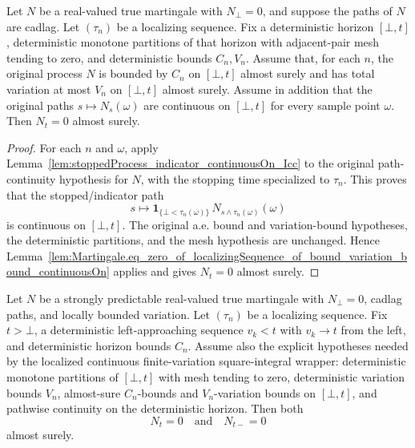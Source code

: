 \begin{lemma}\label{lem:Martingale.eq_zero_of_localizingSequence_of_bound_variation_bound_original_continuousOn}
Let \(N\) be a real-valued true martingale with \(N_\bot=0\), and suppose the
paths of \(N\) are cadlag.  Let \((\tau_n)\) be a localizing sequence.  Fix a
deterministic horizon \([\bot,t]\), deterministic monotone partitions of that
horizon with adjacent-pair mesh tending to zero, and deterministic bounds
\(C_n,V_n\).  Assume that, for each \(n\), the original process \(N\) is
bounded by \(C_n\) on \([\bot,t]\) almost surely and has total variation at
most \(V_n\) on \([\bot,t]\) almost surely.  Assume in addition that the
original paths \(s\mapsto N_s(\omega)\) are continuous on \([\bot,t]\) for
every sample point \(\omega\).  Then \(N_t=0\) almost surely.
\end{lemma}

\begin{proof}
For each \(n\) and \(\omega\), apply
Lemma~\ref{lem:stoppedProcess_indicator_continuousOn_Icc} to the original
path-continuity hypothesis for \(N\), with the stopping time specialized to
\(\tau_n\).  This proves that the stopped/indicator path
\[
  s\longmapsto
  \mathbf 1_{\{\bot<\tau_n(\omega)\}}\,
  N_{s\wedge\tau_n(\omega)}(\omega)
\]
is continuous on \([\bot,t]\).  The original a.e. bound and variation-bound
hypotheses, the deterministic partitions, and the mesh hypothesis are
unchanged.  Hence
Lemma~\ref{lem:Martingale.eq_zero_of_localizingSequence_of_bound_variation_bound_continuousOn}
applies and gives \(N_t=0\) almost surely.
\end{proof}

\begin{lemma}\label{lem:Martingale.eq_zero_and_leftLim_eq_zero_of_localizingSequence_of_bound_variation_bound_original_continuousOn}
Let \(N\) be a strongly predictable real-valued true martingale with
\(N_\bot=0\), cadlag paths, and locally bounded variation.  Let
\((\tau_n)\) be a localizing sequence.  Fix \(t>\bot\), a deterministic
left-approaching sequence \(v_k<t\) with \(v_k\to t\) from the left, and
deterministic horizon bounds \(C_n\).  Assume also the explicit hypotheses
needed by the localized continuous finite-variation square-integral wrapper:
deterministic monotone partitions of \([\bot,t]\) with mesh tending to zero,
deterministic variation bounds \(V_n\), almost-sure \(C_n\)-bounds and
\(V_n\)-variation bounds on \([\bot,t]\), and pathwise continuity on the
deterministic horizon.  Then both
\[
  N_t=0
  \quad\text{and}\quad
  N_{t-}=0
\]
almost surely.
\end{lemma}

